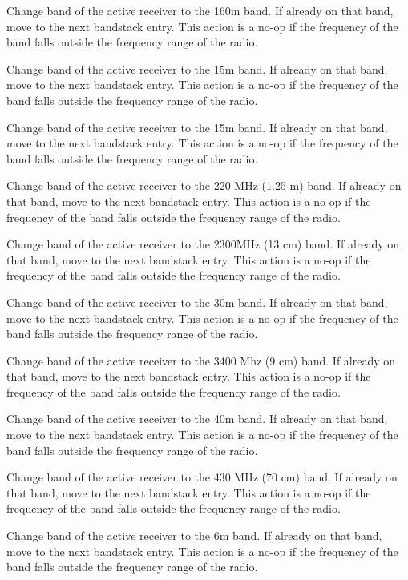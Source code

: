 \documentclass[12pt]{book}
\begin{document}
{Change band of the active receiver to the 160m band. If already on that band, move to
the next bandstack entry. This action is a no-op if the frequency of the band falls outside the frequency 
range of the radio.}

{Change band of the active receiver to the 15m band. If already on that band, move to
the next bandstack entry. This action is a no-op if the frequency of the band falls outside the frequency 
range of the radio.}

{Change band of the active receiver to the 15m band. If already on that band, move to
the next bandstack entry. This action is a no-op if the frequency of the band falls outside the frequency 
range of the radio.}

{Change band of the active receiver to the 220 MHz (1.25 m) band. If already on that band, move to
the next bandstack entry. This action is a no-op if the frequency of the band falls outside the frequency 
range of the radio.}

{Change band of the active receiver to the 2300MHz (13 cm) band. If already on that band, move to
the next bandstack entry. This action is a no-op if the frequency of the band falls outside the frequency 
range of the radio.}

{Change band of the active receiver to the 30m band. If already on that band, move to
the next bandstack entry. This action is a no-op if the frequency of the band falls outside the frequency 
range of the radio.}

{Change band of the active receiver to the 3400 Mhz (9 cm) band. If already on that band, move to
the next bandstack entry. This action is a no-op if the frequency of the band falls outside the frequency 
range of the radio.}

{Change band of the active receiver to the 40m band. If already on that band, move to
the next bandstack entry. This action is a no-op if the frequency of the band falls outside the frequency 
range of the radio.}

{Change band of the active receiver to the 430 MHz (70 cm) band. If already on that band, move to
the next bandstack entry. This action is a no-op if the frequency of the band falls outside the frequency 
range of the radio.}

{Change band of the active receiver to the 6m band. If already on that band, move to
the next bandstack entry. This action is a no-op if the frequency of the band falls outside the frequency 
range of the radio.}
\end{document}
